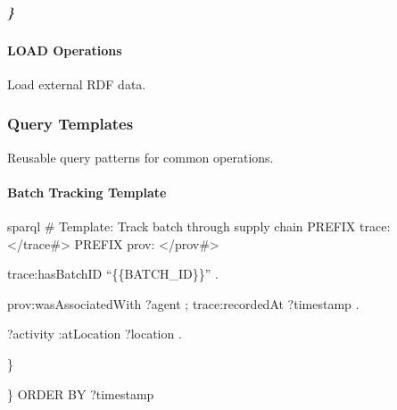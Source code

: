 \documentclass[letterpaper,10pt,english]{sphinxmanual}
\begin{document}
\subparagraph{\}}
\label{\detokenize{api/sparql-api:id125}}

\paragraph{LOAD Operations}
\label{\detokenize{api/sparql-api:load-operations}}
\sphinxAtStartPar
Load external RDF data.

\sphinxAtStartPar
{}


\subsubsection{Query Templates}
\label{\detokenize{api/sparql-api:query-templates}}
\sphinxAtStartPar
Reusable query patterns for common operations.


\paragraph{Batch Tracking Template}
\label{\detokenize{api/sparql-api:batch-tracking-template}}
\sphinxAtStartPar
{\color{red}\bfseries{}\textasciigrave{}\textasciigrave{}}{\color{red}\bfseries{}\textasciigrave{}}sparql
\# Template: Track batch through supply chain
PREFIX trace: \textless{}/trace\#\textgreater{}
PREFIX prov: \textless{}/prov\#\textgreater{}
\begin{description}
\begin{description}
\sphinxAtStartPar
trace:hasBatchID “\{\{BATCH\_ID\}\}” .

\sphinxAtStartPar
prov:wasAssociatedWith ?agent ;
trace:recordedAt ?timestamp .

\sphinxAtStartPar
?activity :atLocation ?location .

\end{description}

\sphinxAtStartPar
\}

\end{description}

\sphinxAtStartPar
\}
ORDER BY ?timestamp
{\color{red}\bfseries{}\textasciigrave{}\textasciigrave{}}{\color{red}\bfseries{}\textasciigrave{}}
\end{document}

